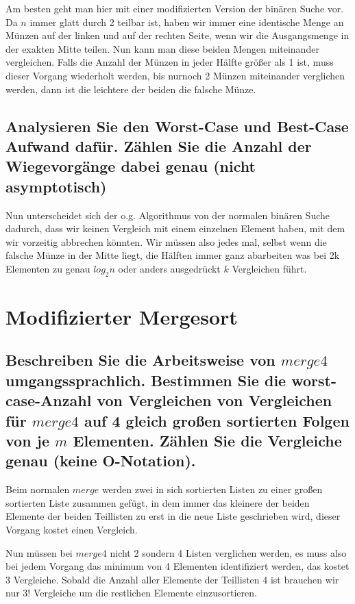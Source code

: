 \documentclass{article}
\begin{document}
Am besten geht man hier mit einer modifizierten Version der binären Suche vor.
Da $n$ immer glatt durch 2 teilbar ist, haben wir immer eine identische Menge an Münzen
auf der linken und auf der rechten Seite, wenn wir die Ausgangsmenge in der exakten
Mitte teilen. Nun kann man diese beiden Mengen miteinander vergleichen. Falls die Anzahl
der Münzen in jeder Hälfte größer als 1 ist, muss dieser Vorgang wiederholt werden, bis
nurnoch 2 Münzen miteinander verglichen werden, dann ist die leichtere der beiden die
falsche Münze.

\subsection{Analysieren Sie den Worst-Case und Best-Case Aufwand dafür. Zählen Sie
die Anzahl der Wiegevorgänge dabei genau (nicht asymptotisch)}

Nun unterscheidet sich der o.g. Algorithmus von der normalen binären Suche dadurch, dass
wir keinen Vergleich mit einem einzelnen Element haben, mit dem wir vorzeitig abbrechen
könnten. Wir müssen also jedes mal, selbst wenn die falsche Münze in der Mitte liegt,
die Hälften immer ganz abarbeiten was bei 2k Elementen zu genau $log_2 n$ oder anders
ausgedrückt $k$ Vergleichen führt.

\section{Modifizierter Mergesort}

\subsection{Beschreiben Sie die Arbeitsweise von $merge4$ umgangssprachlich. Bestimmen
Sie die worst-case-Anzahl von Vergleichen von Vergleichen für $merge4$ auf 4 gleich
großen sortierten Folgen von je $m$ Elementen. Zählen Sie die Vergleiche genau (keine
O-Notation).}

Beim normalen $merge$ werden zwei in sich sortierten Listen zu einer großen sortierten
Liste zusammen gefügt, in dem immer das kleinere der beiden Elemente der beiden Teillisten
zu erst in die neue Liste geschrieben wird, dieser Vorgang kostet einen Vergleich.

Nun müssen bei $merge4$ nicht 2 sondern 4 Listen verglichen werden, es muss also bei jedem
Vorgang das minimum von 4 Elementen identifiziert werden, das kostet 3 Vergleiche. Sobald
die Anzahl aller Elemente der Teillisten 4 ist brauchen wir nur $3!$ Vergleiche um die restlichen
Elemente einzusortieren.
\end{document}
